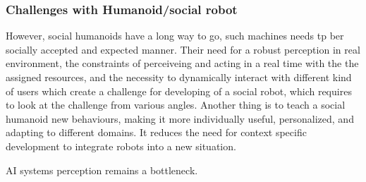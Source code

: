 \documentclass[fleqn,10pt]{wlscirep}
\begin{document}
\subsubsection{}
\subsubsection{Challenges with Humanoid/social robot}

However,  social humanoids have a long way to go, such machines needs tp ber socially accepted and expected manner. Their need for a robust perception in real environment, the constraints of perceiveing and acting in a real time with the the assigned resources, and the necessity to dynamically interact with different kind of users which create a challenge for developing of a social robot, which requires to look at the challenge from various angles. Another thing is to teach a social humanoid new behaviours, making it  more individually useful, personalized, and adapting to different domains. It reduces the need for context specific development to integrate robots into a new situation\cite{Alexandre}.

AI systems perception remains a bottleneck.


\end{document}
